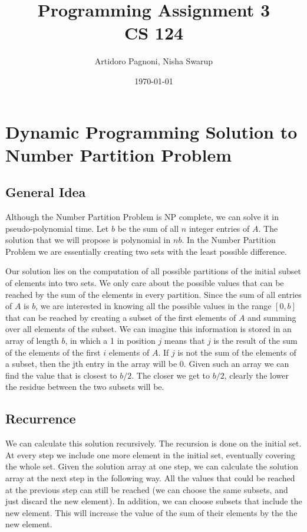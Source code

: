 \documentclass[11pt]{article}
\begin{document}
\title{Programming Assignment 3\\
CS 124}
\author{Artidoro Pagnoni, Nisha Swarup}
\date{\today}
\maketitle

\tableofcontents
\clearpage
\section{Dynamic Programming Solution to Number Partition Problem}
\subsection{General Idea}
Although the Number Partition Problem is NP complete, we can solve it in pseudo-polynomial time. Let $b$ be the sum of all $n$ integer entries of $A$. The solution that we will propose is polynomial in $nb$. In the Number Partition Problem we are essentially creating two sets with the least possible difference. 

Our solution lies on the computation of all possible partitions of the initial subset of elements into two sets. We only care about the possible values that can be reached by the sum of the elements in every partition. Since the sum of all entries of $A$ is $b$, we are interested in knowing all the possible values in the range $[0,b]$ that can be reached by creating a subset of the first elements of $A$ and summing over all elements of the subset. We can imagine this information is stored in an array of length $b$, in which a 1 in position $j$ means that $j$ is the result of the sum of the elements of the first $i$ elements of $A$. If $j$ is not the sum of the elements of a subset, then the jth entry in the array will be 0.  Given such an array we can find the value that is closest to $b/2$. The closer we get to $b/2$, clearly the lower the residue between the two subsets will be. 

\subsection{Recurrence}
We can calculate this solution recursively. The recursion is done on the initial set. At every step we include one more element in the initial set, eventually covering the whole set. Given the solution array at one step, we can calculate the solution array at the next step in the following way. All the values that could be reached at the previous step can still be reached (we can choose the same subsets, and just discard the new element). In addition, we can choose subsets that include the new element. This will increase the value of the sum of their elements by the the new element. 
\end{document}
